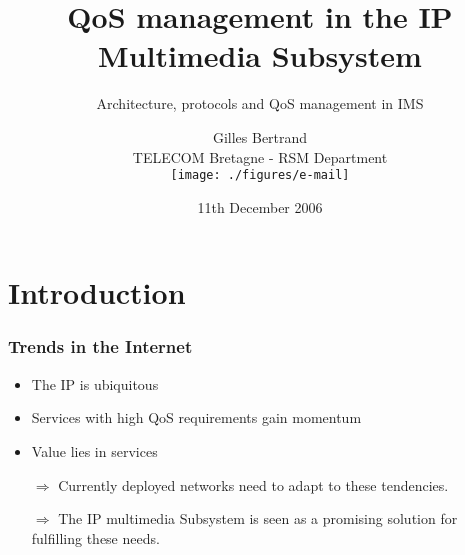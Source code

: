 \documentclass[pdf]{beamer}
\begin{document}
\title[QoS management in IMS]{QoS management in the IP Multimedia Subsystem\\}
\subtitle {Architecture, protocols and QoS management in IMS}
\author[Gilles Bertrand]{Gilles Bertrand\\TELECOM Bretagne - RSM Department\\
\vspace*{0.5cm}    
\texttt{[image: ./figures/e-mail]}
}
\date{11th December 2006}

\subject{QoS management in the IP Multimedia Subsystem (IMS)}

\frame{
 \titlepage
}




\section*{Introduction}
\begin{frame}
    \frametitle{Trends in the Internet}
    \begin{itemize}
        \item The IP is ubiquitous
        \item Services with high QoS requirements   gain momentum
        \item Value lies in services
        \pause
        \item[$\Rightarrow$] Currently deployed networks need to adapt to these tendencies.
     \item[$\Rightarrow$] The IP multimedia Subsystem is seen as a promising solution for fulfilling these needs.
    \end{itemize}
\end{frame}
\end{document}
